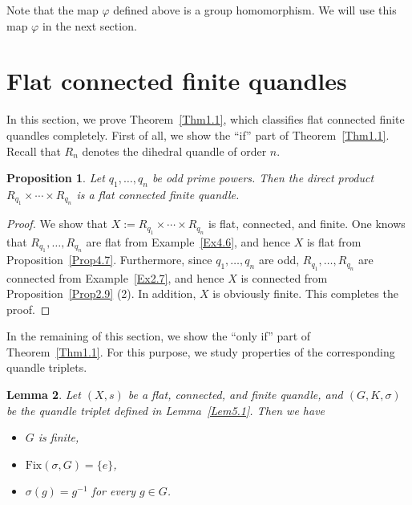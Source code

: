 \documentclass[12pt]{amsart}
\newtheorem{Prop}{Proposition}[section]
\newtheorem{Lem}[Prop]{Lemma}
\theoremstyle{definition}
\begin{document}
Note that the map $ \varphi $ defined above is a group homomorphism. We will use this map $ \varphi $ in the next section.

\section{Flat connected finite quandles}\label{sec6}

In this section, we prove Theorem~\ref{Thm1.1}, which classifies flat connected finite quandles completely. First of all, we show the ``if'' part of Theorem~\ref{Thm1.1}. Recall that $ R_{n} $ denotes the dihedral quandle of order $ n $.

\begin{Prop}\label{Prop6.1}
Let $ q_{1}, \ldots, q_{n} $ be odd prime powers. Then the direct product $ R_{q_{1}} \times \cdots \times R_{q_{n}} $ is a flat connected finite quandle.
\end{Prop}

\begin{proof}
We show that $ X := R_{q_{1}} \times \cdots \times R_{q_{n}} $ is flat, connected, and finite. One knows that $ R_{q_{1}}, \ldots, R_{q_{n}} $ are flat from Example~\ref{Ex4.6}, and hence $ X $ is flat from Proposition~\ref{Prop4.7}. Furthermore, since $ q_{1}, \ldots, q_{n} $ are odd, $ R_{q_{1}}, \ldots, R_{q_{n}} $ are connected from Example~\ref{Ex2.7}, and hence $ X $ is connected from Proposition~\ref{Prop2.9} (2). In addition, $ X $ is obviously finite. This completes the proof.
\end{proof}

In the remaining of this section, we show the ``only if'' part of Theorem~\ref{Thm1.1}. For this purpose, we study properties of the corresponding quandle triplets.

\begin{Lem}\label{Lem6.2}
Let $ (X,s) $ be a flat, connected, and finite quandle, and $ (G,K,\sigma) $ be the quandle triplet defined in Lemma~\ref{Lem5.1}. Then we have
\begin{itemize}
\item[(1)]
$ G $ is finite,
\item[(2)]
$ {\mathrm{Fix}}(\sigma,G) = \{ e \} $,
\item[(3)]
$ \sigma(g) = g^{-1} $ for every $ g \in G $.
\end{itemize}
\end{Lem}
\end{document}
